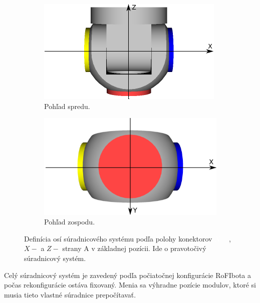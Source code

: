 \documentclass[
  digital, %
  oneside, %
  notable,   %
  lof,     %
  nolot,     %
]{fithesis3}
\begin{document}
\begin{figure}[hbt!]
    \centering
    \begin{subfigure}[b]{0.47\textwidth}
        \includegraphics[width=\textwidth]{pictures/module_dock_identification.pdf}
        \caption[Pohľad spredu]{Pohľad spredu.}
    \end{subfigure}
    \begin{subfigure}[b]{0.47\textwidth}
        \includegraphics[width=\textwidth]{pictures/module_dock_identification_bottom.pdf}
        \caption[Pohľad zospodu]{Pohľad zospodu.}
    \end{subfigure}
    \caption[Definícia osí súradnicového systému]{Definícia osí súradnicového systému podľa polohy konektorov \textcolor{white}{\colorbox{modra}{$X+$}}, \colorbox{zlta}{$X-$} a \colorbox{cervena}{$Z-$} strany A v základnej pozícii. Ide o pravotočivý súradnicový systém. }
    \label{fig:moduleAxis}
\end{figure}

Celý súradnicový systém je zavedený podľa počiatočnej konfigurácie RoFIbota a počas rekonfigurácie ostáva fixovaný. Menia sa výhradne pozície modulov, ktoré si musia tieto vlastné súradnice prepočítavať. 
\end{document}
